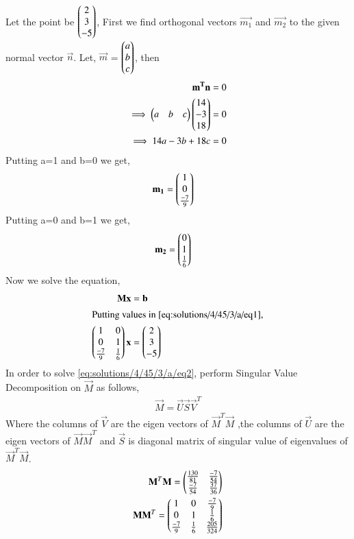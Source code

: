  Let the point be $\begin{pmatrix}2\\3\\-5\end{pmatrix}$,
First we find orthogonal vectors $\vec{m_1}$ and $\vec{m_2}$ to the given normal vector $\vec{n}$. Let, $\vec{m}$ = $\begin{pmatrix}a\\b\\c\end{pmatrix}$, then
\begin{align}
\mathbf{m^T}\mathbf{n} &= 0\\
\implies\begin{pmatrix}a&b&c\end{pmatrix}\begin{pmatrix}14\\-3\\18\end{pmatrix} &= 0\\
\implies 14a-3b+18c &= 0
\end{align}
Putting a=1 and b=0 we get,
\begin{align}
\mathbf{m_1} &= \begin{pmatrix}1\\0\\\frac{-7}{9}\end{pmatrix}\end{align}
Putting a=0 and b=1 we get,
\begin{align}
\mathbf{m_2} &= \begin{pmatrix}0\\1\\\frac{1}{6}\end{pmatrix}
\end{align}
Now we solve the equation,
\begin{align}
\mathbf{M}\mathbf{x} &= \mathbf{b}\label{eq:solutions/4/45/3/a/eq1}\\
\intertext{Putting values in \eqref{eq:solutions/4/45/3/a/eq1},}
\begin{pmatrix}1&0\\0&1\\\frac{-7}{9}&\frac{1}{6}\end{pmatrix}\mathbf{x} &= \begin{pmatrix}2\\3\\-5\end{pmatrix}\label{eq:solutions/4/45/3/a/eq2}
\end{align}
In order to solve \eqref{eq:solutions/4/45/3/a/eq2},  perform Singular Value Decomposition on $\vec{M}$ as follows,
\begin{align}
\vec{M}=\vec{U}\vec{S}\vec{V}^T\label{eq:solutions/4/45/3/a/eq100}
\end{align}
Where the columns of $\vec{V}$ are the eigen vectors of $\vec{M}^T\vec{M}$ ,the columns of $\vec{U}$ are the eigen vectors of $\vec{M}\vec{M}^T$ and $\vec{S}$ is diagonal matrix of singular value of eigenvalues of $\vec{M}^T\vec{M}$.
\begin{align}
\mathbf{M}^T\mathbf{M}=\begin{pmatrix}\frac{130}{81}&\frac{-7}{54}\\\frac{-7}{54}&\frac{37}{36}\end{pmatrix}\label{eq:solutions/4/45/3/a/eqMTM}\\
\mathbf{M}\mathbf{M}^T=\begin{pmatrix}1&0&\frac{-7}{9}\\0&1&\frac{1}{6}\\\frac{-7}{9}&\frac{1}{6}&\frac{205}{324}\end{pmatrix}
\end{align}
